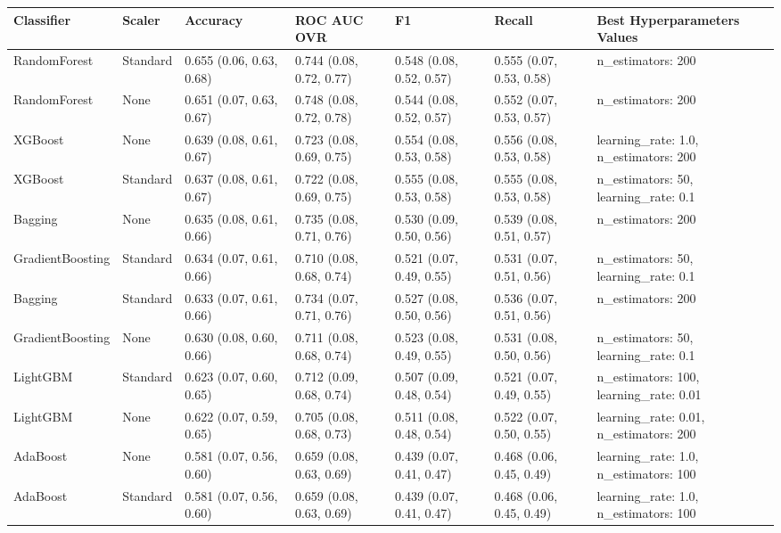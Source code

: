 \begin{tabular}{lllllll}
\toprule
Classifier & Scaler & Accuracy & ROC AUC OVR & F1 & Recall & Best Hyperparameters Values \\
\midrule
RandomForest & Standard & 0.655 (0.06, 0.63, 0.68) & 0.744 (0.08, 0.72, 0.77) & 0.548 (0.08, 0.52, 0.57) & 0.555 (0.07, 0.53, 0.58) & {{n\_estimators: 200}} \\
RandomForest & None & 0.651 (0.07, 0.63, 0.67) & 0.748 (0.08, 0.72, 0.78) & 0.544 (0.08, 0.52, 0.57) & 0.552 (0.07, 0.53, 0.57) & {{n\_estimators: 200}} \\
XGBoost & None & 0.639 (0.08, 0.61, 0.67) & 0.723 (0.08, 0.69, 0.75) & 0.554 (0.08, 0.53, 0.58) & 0.556 (0.08, 0.53, 0.58) & {{learning\_rate: 1.0, n\_estimators: 200}} \\
XGBoost & Standard & 0.637 (0.08, 0.61, 0.67) & 0.722 (0.08, 0.69, 0.75) & 0.555 (0.08, 0.53, 0.58) & 0.555 (0.08, 0.53, 0.58) & {{n\_estimators: 50, learning\_rate: 0.1}} \\
Bagging & None & 0.635 (0.08, 0.61, 0.66) & 0.735 (0.08, 0.71, 0.76) & 0.530 (0.09, 0.50, 0.56) & 0.539 (0.08, 0.51, 0.57) & {{n\_estimators: 200}} \\
GradientBoosting & Standard & 0.634 (0.07, 0.61, 0.66) & 0.710 (0.08, 0.68, 0.74) & 0.521 (0.07, 0.49, 0.55) & 0.531 (0.07, 0.51, 0.56) & {{n\_estimators: 50, learning\_rate: 0.1}} \\
Bagging & Standard & 0.633 (0.07, 0.61, 0.66) & 0.734 (0.07, 0.71, 0.76) & 0.527 (0.08, 0.50, 0.56) & 0.536 (0.07, 0.51, 0.56) & {{n\_estimators: 200}} \\
GradientBoosting & None & 0.630 (0.08, 0.60, 0.66) & 0.711 (0.08, 0.68, 0.74) & 0.523 (0.08, 0.49, 0.55) & 0.531 (0.08, 0.50, 0.56) & {{n\_estimators: 50, learning\_rate: 0.1}} \\
LightGBM & Standard & 0.623 (0.07, 0.60, 0.65) & 0.712 (0.09, 0.68, 0.74) & 0.507 (0.09, 0.48, 0.54) & 0.521 (0.07, 0.49, 0.55) & {{n\_estimators: 100, learning\_rate: 0.01}} \\
LightGBM & None & 0.622 (0.07, 0.59, 0.65) & 0.705 (0.08, 0.68, 0.73) & 0.511 (0.08, 0.48, 0.54) & 0.522 (0.07, 0.50, 0.55) & {{learning\_rate: 0.01, n\_estimators: 200}} \\
AdaBoost & None & 0.581 (0.07, 0.56, 0.60) & 0.659 (0.08, 0.63, 0.69) & 0.439 (0.07, 0.41, 0.47) & 0.468 (0.06, 0.45, 0.49) & {{learning\_rate: 1.0, n\_estimators: 100}} \\
AdaBoost & Standard & 0.581 (0.07, 0.56, 0.60) & 0.659 (0.08, 0.63, 0.69) & 0.439 (0.07, 0.41, 0.47) & 0.468 (0.06, 0.45, 0.49) & {{learning\_rate: 1.0, n\_estimators: 100}} \\

\end{tabular}
